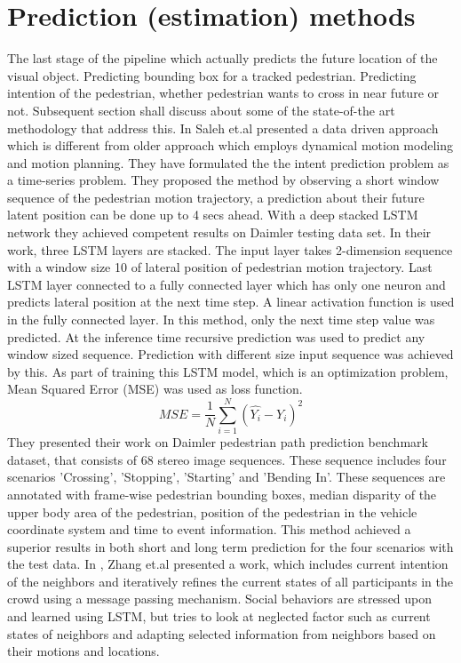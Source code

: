 \section{Prediction (estimation) methods }
The last stage of the pipeline which actually predicts the future location of the visual object. Predicting  bounding box for a tracked pedestrian. Predicting intention of the pedestrian, whether pedestrian wants to cross in near future or not. Subsequent section shall discuss about some of the state-of-the art methodology that address this.
In \cite{saleh2017intent} Saleh et.al presented a data driven approach which is different from older approach which employs dynamical motion modeling and motion planning. They have formulated the the intent prediction problem as a time-series problem. They proposed the method by observing a short window sequence of the pedestrian motion trajectory, a prediction about their future latent position can be done up to 4 secs ahead. With a deep stacked LSTM network they achieved competent results on Daimler testing data set. In their work, three LSTM layers are stacked. The input layer takes 2-dimension sequence with a window size 10 of lateral position of pedestrian motion trajectory. Last LSTM layer connected to a fully connected layer which has only one neuron and predicts lateral position at the next time step. A linear activation function is used in the fully connected layer. In this method, only the next time step value was predicted. At the inference time recursive prediction was used to predict any window sized sequence. Prediction with different size input sequence was achieved by this.
As part of training this LSTM  model, which is an optimization problem, Mean Squared Error (MSE) was used as loss function.
\begin{equation}
MSE= \frac{1}{N}\sum_{i=1}^{N}(\hat{Y_i} - Y_i)^2
\end{equation}
They presented their work on Daimler pedestrian path prediction benchmark dataset, that consists of 68 stereo image sequences. These sequence includes four scenarios 'Crossing', 'Stopping', 'Starting' and 'Bending In'. These sequences are annotated with frame-wise pedestrian bounding boxes, median disparity of the upper body area of the pedestrian, position of the pedestrian in the vehicle coordinate system and time to event information. This method achieved a superior results in both short and long term prediction for the four scenarios with the test data.
In \cite{zhang2019sr}, Zhang et.al presented a work, which includes current intention of the neighbors and iteratively refines the current states of all participants in the crowd using a message passing mechanism. Social behaviors are stressed upon and learned using LSTM, but \cite{zhang2019sr} tries to look at neglected factor such as current states of neighbors and adapting selected information from neighbors based on their motions and locations.




